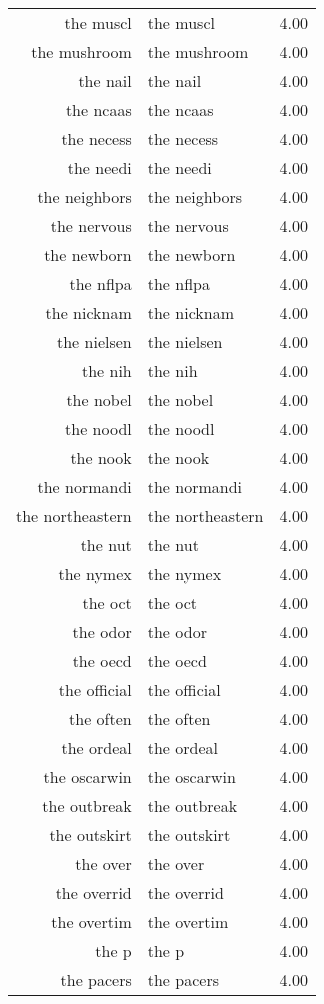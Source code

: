 \begin{table}[ht]
\begin{tabular}{rlr}
  the muscl & the muscl & 4.00 \\ 
  the mushroom & the mushroom & 4.00 \\ 
  the nail & the nail & 4.00 \\ 
  the ncaas & the ncaas & 4.00 \\ 
  the necess & the necess & 4.00 \\ 
  the needi & the needi & 4.00 \\ 
  the neighbors & the neighbors & 4.00 \\ 
  the nervous & the nervous & 4.00 \\ 
  the newborn & the newborn & 4.00 \\ 
  the nflpa & the nflpa & 4.00 \\ 
  the nicknam & the nicknam & 4.00 \\ 
  the nielsen & the nielsen & 4.00 \\ 
  the nih & the nih & 4.00 \\ 
  the nobel & the nobel & 4.00 \\ 
  the noodl & the noodl & 4.00 \\ 
  the nook & the nook & 4.00 \\ 
  the normandi & the normandi & 4.00 \\ 
  the northeastern & the northeastern & 4.00 \\ 
  the nut & the nut & 4.00 \\ 
  the nymex & the nymex & 4.00 \\ 
  the oct & the oct & 4.00 \\ 
  the odor & the odor & 4.00 \\ 
  the oecd & the oecd & 4.00 \\ 
  the official & the official & 4.00 \\ 
  the often & the often & 4.00 \\ 
  the ordeal & the ordeal & 4.00 \\ 
  the oscarwin & the oscarwin & 4.00 \\ 
  the outbreak & the outbreak & 4.00 \\ 
  the outskirt & the outskirt & 4.00 \\ 
  the over & the over & 4.00 \\ 
  the overrid & the overrid & 4.00 \\ 
  the overtim & the overtim & 4.00 \\ 
  the p & the p & 4.00 \\ 
  the pacers & the pacers & 4.00 \\ 

\end{tabular}
\end{table}

